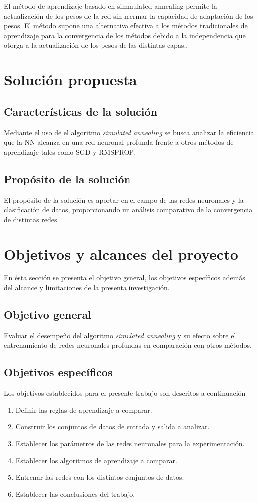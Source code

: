 El método de aprendizaje basado en simmulated annealing permite la actualización de los pesos de la red sin mermar la capacidad de adaptación de los pesos. El método supone una alternativa efectiva a los métodos tradicionales de aprendizaje para la convergencia de los métodos debido a la independencia que otorga a la actualización de los pesos de las distintas capas..


\section{Solución propuesta}
\subsection{Características de la solución}
Mediante el uso de el algoritmo {\em simulated annealing} se busca analizar la eficiencia que la NN alcanza en una red neuronal profunda frente a otros métodos de aprendizaje tales como SGD y RMSPROP.

\subsection{Propósito de la solución}
El propósito de la solución es aportar en el campo de las redes neuronales y la clasificación de datos, proporcionando un análisis comparativo de la convergencia de distintas redes.

\section{Objetivos y alcances del proyecto}
En ésta sección se presenta el objetivo general, los objetivos específicos además del alcance y limitaciones de la presenta investigación.

\subsection{Objetivo general}
Evaluar el desempeño del algoritmo {\em simulated annealing} y su efecto sobre el entrenamiento de redes neuronales profundas en comparación con otros métodos.

\subsection{Objetivos específicos}
Los objetivos establecidos para el presente trabajo son descritos a continuación
\begin{enumerate}
	\item Definir las reglas de aprendizaje a comparar.
	\item Construir los conjuntos de datos de entrada y salida a analizar.
	\item Establecer los parámetros de las redes neuronales para la experimentación.
	\item Establecer los algoritmos de aprendizaje a comparar.
	\item Entrenar las redes con los distintos conjuntos de datos.
	\item Establecer las conclusiones del trabajo.
\end{enumerate}

